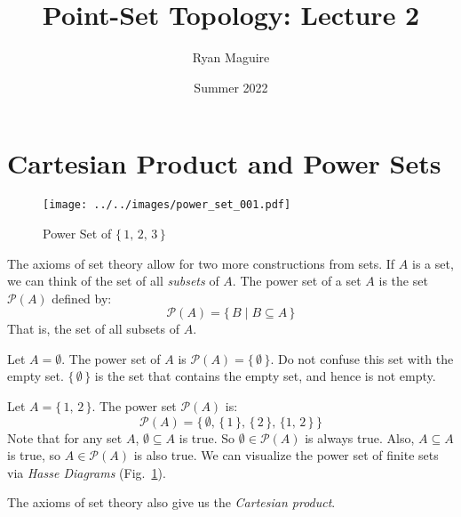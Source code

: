 \documentclass{article}
\title{Point-Set Topology: Lecture 2}
\author{Ryan Maguire}
\date{Summer 2022}
\theoremstyle{plain}
\theoremstyle{normal}
\newenvironment{example}{%
    \pushQED{\qed}\renewcommand{\qedsymbol}{$\blacksquare$}\examplex%
}{%
    \popQED\endexamplex%
}
\newenvironment{definition}{%
    \pushQED{\qed}\renewcommand{\qedsymbol}{$\blacksquare$}\definitionx%
}{%
    \popQED\enddefinitionx%
}
\begin{document}
    \maketitle
    \section{Cartesian Product and Power Sets}
        \begin{figure}
            \centering
            \texttt{[image: ../../images/power\_set\_001.pdf]}
            \caption{Power Set of $\{\,1,\,2,\,3\,\}$}
            \label{fig:power_set_001}
        \end{figure}
        The axioms of set theory allow for two more constructions from sets.
        If $A$ is a set, we can think of the set of all \textit{subsets} of
        $A$.
        \begin{definition}[\textbf{Power Sets}]
            The power set of a set $A$ is the set $\mathcal{P}(A)$ defined by:
            \begin{equation}
                \mathcal{P}(A)=\{\,B\;|\;B\subseteq{A}\,\}
            \end{equation}
            That is, the set of all subsets of $A$.
        \end{definition}
        \begin{example}
            Let $A=\emptyset$. The power set of $A$ is
            $\mathcal{P}(A)=\{\,\emptyset\,\}$. Do not confuse this set with
            the empty set. $\{\,\emptyset\,\}$ is the set that contains the
            empty set, and hence is not empty.
        \end{example}
        \begin{example}
            Let $A=\{\,1,\,2\,\}$. The power set $\mathcal{P}(A)$ is:
            \begin{equation}
                \mathcal{P}(A)=\big\{\,\emptyset,\,\{\,1\,\},\,
                    \{\,2\,\},\,\{1,\,2\,\}\,\big\}
            \end{equation}
        \end{example}
        Note that for any set $A$, $\emptyset\subseteq{A}$ is true. So
        $\emptyset\in\mathcal{P}(A)$ is always true. Also, $A\subseteq{A}$
        is true, so $A\in\mathcal{P}(A)$ is also true. We can visualize the
        power set of finite sets via \textit{Hasse Diagrams}
        (Fig.~\ref{fig:power_set_001}).
        \par\hfill\par
        The axioms of set theory also give us the \textit{Cartesian product}.
\end{document}
